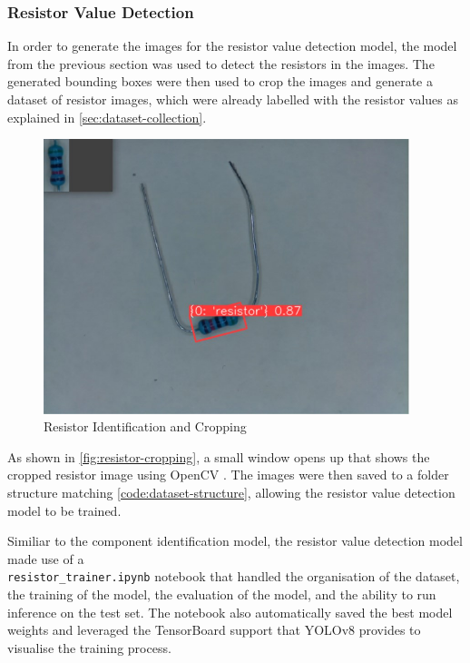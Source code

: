 \subsubsection{Resistor Value Detection}
In order to generate the images for the resistor value detection model, the model from the previous section was used to detect the resistors in the images. The generated bounding boxes were then used to crop the images and generate a dataset of resistor images, which were already labelled with the resistor values as explained in \autoref{sec:dataset-collection}.

\begin{figure}[H]
  \hfill
  \begin{minipage}[t]{\textwidth}
    \centering
    \includegraphics[height=8cm]{imgs/cv/2024-06-10_21-45-23_python.jpg}
    \caption{Resistor Identification and Cropping}
    \label{fig:resistor-cropping}
  \end{minipage}
\end{figure}

As shown in \autoref{fig:resistor-cropping}, a small window opens up that shows the cropped resistor image using OpenCV \cite{home_2024}. The images were then saved to a folder structure matching \autoref{code:dataset-structure}, allowing the resistor value detection model to be trained.

Similiar to the component identification model, the resistor value detection model made use of a 
\\ \texttt{resistor\_trainer.ipynb} notebook that handled the organisation of the dataset, the training of the model, the evaluation of the model, and the ability to run inference on the test set. The notebook also automatically saved the best model weights and leveraged the TensorBoard support that YOLOv8 provides to visualise the training process.

